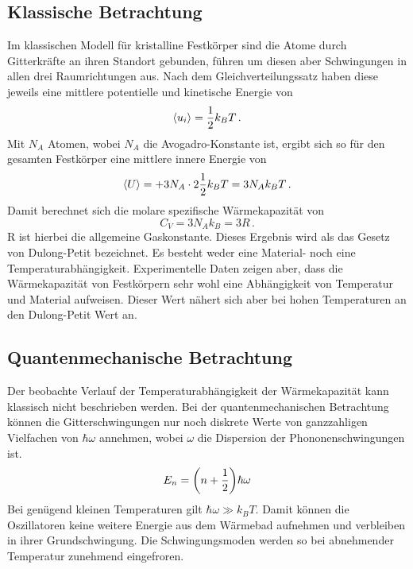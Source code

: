 \subsection{Klassische Betrachtung}

Im klassischen Modell für kristalline Festkörper sind die Atome durch Gitterkräfte an ihren Standort gebunden, führen um diesen aber Schwingungen in allen drei Raumrichtungen  aus. Nach dem Gleichverteilungssatz haben diese jeweils eine mittlere potentielle und kinetische Energie von
\begin{equation}
	\expval{u_i} = \frac{1}{2}k_B T \,.
\end{equation}
Mit $N_A$ Atomen, wobei $N_A$ die Avogadro-Konstante ist, ergibt sich so für den gesamten Festkörper eine mittlere innere Energie von
\begin{equation}
	\expval{U} = + 3N_A \cdot 2 \frac{1}{2} k_B T =  3 N_A k_B T \,.
\end{equation}
Damit berechnet sich die molare spezifische Wärmekapazität von
\begin{equation}
	C_V = 3 N_A k_B = 3 R \,.
	\label{eq:D-P}
\end{equation}
R ist hierbei die allgemeine Gaskonstante. Dieses Ergebnis wird als das Gesetz von Dulong-Petit bezeichnet.
Es besteht weder eine Material- noch eine Temperaturabhängigkeit. Experimentelle Daten zeigen aber,  dass die Wärmekapazität von Festkörpern sehr wohl eine Abhängigkeit von Temperatur und Material aufweisen. Dieser Wert nähert sich aber bei hohen Temperaturen an den Dulong-Petit Wert an. 

\subsection{Quantenmechanische Betrachtung}

Der beobachte Verlauf der Temperaturabhängigkeit der Wärmekapazität kann klassisch nicht beschrieben werden. Bei der quantenmechanischen Betrachtung können die Gitterschwingungen nur noch diskrete Werte von ganzzahligen Vielfachen von $\hbar \omega$ annehmen, wobei $\omega$ die Dispersion der Phononenschwingungen ist.
\begin{equation}
	E_n = \qty(n + \frac{1}{2})\hbar \omega
\end{equation}
Bei genügend kleinen Temperaturen gilt $\hbar \omega \gg k_B T$. Damit können die Oszillatoren keine weitere Energie aus dem Wärmebad aufnehmen und verbleiben in ihrer Grundschwingung. Die Schwingungsmoden werden so bei abnehmender Temperatur zunehmend eingefroren.


